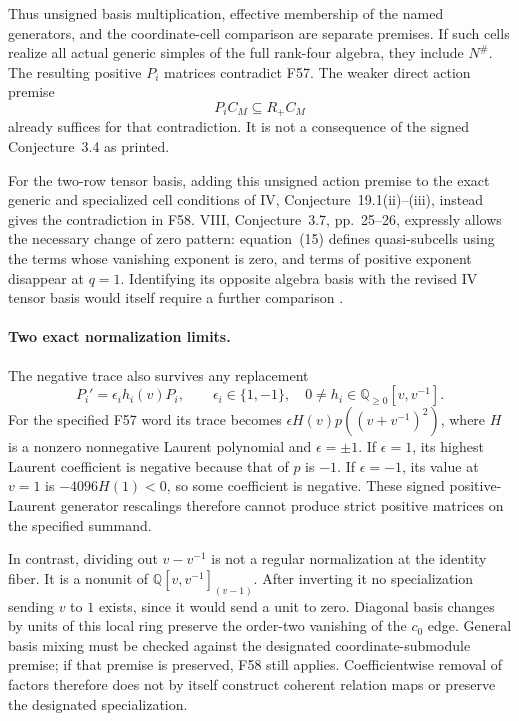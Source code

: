 \documentclass[11pt,a4paper]{article}
\newcommand{\fid}[1]{\textsf{#1}}\newcommand{\gate}[1]{\textsf{#1}}
\theoremstyle{named}\newtheorem{finding}{Finding}[section]
\theoremstyle{definition}\newtheorem{definition}[finding]{Definition}
\theoremstyle{remark}\newtheorem{remark}[finding]{Remark}
\begin{document}
Thus unsigned basis multiplication, effective membership
of the named generators, and the coordinate-cell
comparison are separate premises.
If such cells realize all actual generic simples of the
full rank-four algebra, they include \(N^\#\).
The resulting positive \(P_i\) matrices contradict
\fid{F57}.
The weaker direct action premise
\[
                       P_iC_M\subseteq R_+C_M
\]
already suffices for that contradiction.
It is not a consequence of the signed
Conjecture~3.4 as printed.

For the two-row tensor basis, adding this unsigned
action premise to the exact generic and specialized
cell conditions of IV, Conjecture~19.1(ii)--(iii),
instead gives the contradiction in \fid{F58}.
VIII, Conjecture~3.7, pp.~25--26, expressly allows
the necessary change of zero pattern: equation~(15)
defines quasi-subcells using the terms whose vanishing
exponent is zero, and terms of positive exponent
disappear at \(q=1\).
Identifying its opposite algebra basis with the
revised IV tensor basis would itself require a
further comparison \cite{VIII,IV}.

\paragraph{Two exact normalization limits.}
The negative trace also survives any replacement
\[
 P_i'=\epsilon_i h_i(v)P_i,\qquad
 \epsilon_i\in\{1,-1\},\quad
 0\ne h_i\in\mathbb Q_{\ge0}[v,v^{-1}].
\]
For the specified \fid{F57} word its trace becomes
\(\epsilon H(v)p((v+v^{-1})^2)\), where \(H\) is a
nonzero nonnegative Laurent polynomial and
\(\epsilon=\pm1\).
If \(\epsilon=1\), its highest Laurent coefficient
is negative because that of \(p\) is \(-1\).
If \(\epsilon=-1\), its value at \(v=1\) is
\(-4096H(1)<0\), so some coefficient is negative.
These signed positive-Laurent generator rescalings
therefore cannot produce strict positive matrices
on the specified summand.

In contrast, dividing out \(v-v^{-1}\) is not a
regular normalization at the identity fiber.
It is a nonunit of
\(\mathbb Q[v,v^{-1}]_{(v-1)}\).
After inverting it no specialization sending
\(v\) to \(1\) exists, since it would send a unit
to zero. Diagonal basis changes by units of this
local ring preserve the order-two vanishing of
the \(c_0\) edge. General basis mixing must be checked
against the designated coordinate-submodule premise;
if that premise
is preserved, \fid{F58} still applies.
Coefficientwise removal of factors therefore does
not by itself construct coherent relation maps or
preserve the designated specialization.
\end{document}

